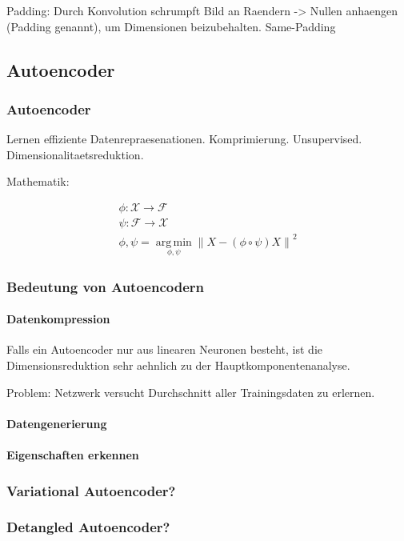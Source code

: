 \documentclass[../main]{subfiles}
\begin{document}
Padding:
Durch Konvolution schrumpft Bild an Raendern -> Nullen anhaengen (Padding
genannt), um Dimensionen beizubehalten. Same-Padding


\subsection{Autoencoder}

\subsubsection{Autoencoder}
Lernen effiziente Datenrepraesenationen. Komprimierung. Unsupervised.
Dimensionalitaetsreduktion.

Mathematik:


\begin{gather}
  \phi: \mathcal{X} \to \mathcal{F}\\
  \psi: \mathcal{F} \to \mathcal{X}\\
  \displaystyle\phi,\psi = \operatorname*{arg\,min}_{\phi,\psi} \parallel {X - (\phi \circ \psi)X \parallel}^2
\end{gather}

\subsubsection{Bedeutung von Autoencodern}
\paragraph{Datenkompression}
Falls ein Autoencoder nur aus linearen Neuronen besteht, ist die
Dimensionsreduktion sehr aehnlich zu der Hauptkomponentenanalyse.

Problem: Netzwerk versucht Durchschnitt aller Trainingsdaten zu erlernen.
\paragraph{Datengenerierung}
\paragraph{Eigenschaften erkennen}


\subsubsection{Variational Autoencoder?}
\subsubsection{Detangled Autoencoder?}
\end{document}
